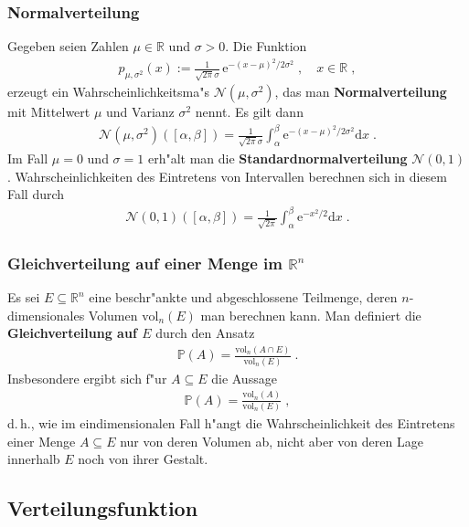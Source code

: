 \documentclass[ngerman,draft,parskip=half,twoside]{scrartcl}
\newcommand*{\R}{\mathbb{R}}      %
\newcommand*{\WKM}{\mathbb{P}}      %
\begin{document}
\subsubsection{Normalverteilung}
Gegeben seien Zahlen $\mu\in\R$ und $\sigma>0$. Die
Funktion
\begin{gather*}
  p_{\mu,\sigma^2}(x):= \frac{1}{\sqrt{2\pi}\sigma}\,\mathrm e^{-(x-\mu)^2/2\sigma^2}\;,
     \quad x\in\R\;,
\end{gather*}
erzeugt ein Wahrscheinlichkeitsma"s $\mathcal N(\mu,\sigma^2)$, das
man \textbf{Normalverteilung} mit Mittelwert $\mu$ und Varianz $\sigma^2$ nennt. Es gilt dann
\begin{gather*}
  \mathcal N(\mu,\sigma^2)([\alpha,\beta])=\frac{1}{\sqrt{2\pi}\sigma}
     \int_\alpha^\beta \mathrm e^{-(x-\mu)^2/2\sigma^2}\mathrm dx\;.
\end{gather*}
Im Fall $\mu=0$ und $\sigma=1$ erh"alt man die \textbf{Standardnormalverteilung}
$\mathcal N(0,1)$ . Wahrscheinlichkeiten des Eintretens von Intervallen berechnen sich in diesem Fall durch
\begin{gather*}
  \mathcal N(0,1)([\alpha,\beta])=\frac{1}{\sqrt{2\pi}}
     \int_\alpha^\beta \mathrm e^{-x^2/2}\mathrm dx\;.
\end{gather*}

\subsubsection{Gleichverteilung auf einer Menge im $\R^n$}
Es sei $E\subseteq \R^n$ eine beschr"ankte und abgeschlossene
Teilmenge, deren $n$-dimensionales Volumen $\mathrm{vol}_n(E)$ man
berechnen kann. Man definiert die \textbf{Gleichverteilung auf $E$} durch den Ansatz
\begin{gather*}
  \WKM(A)=\frac{\mathrm{vol}_n(A\cap E)}{\mathrm{vol}_n(E)}\;.
\end{gather*}
Insbesondere ergibt sich f"ur $A\subseteq E$ die Aussage
\begin{gather*}
  \WKM(A)=\frac{\mathrm{vol}_n(A)}{\mathrm{vol}_n(E)}\;,
\end{gather*}
d.\,h., wie im eindimensionalen Fall h"angt die Wahrscheinlichkeit des Eintretens einer Menge $A\subseteq E$
nur von deren Volumen ab, nicht aber von deren Lage innerhalb $E$ noch von ihrer Gestalt.
\subsection{Verteilungsfunktion}
\end{document}
